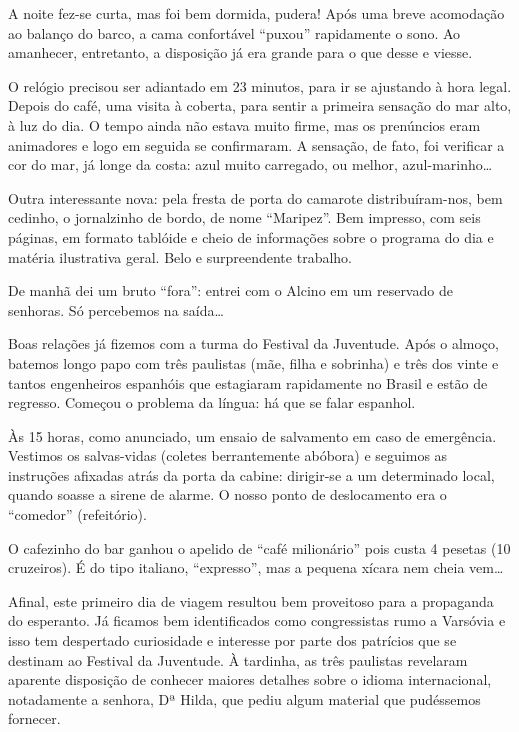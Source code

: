 A noite fez-se curta, mas foi bem dormida, pudera! Após uma breve acomodação ao balanço do barco, a cama confortável “puxou” rapidamente o sono. Ao amanhecer, entretanto, a disposição já era grande para o que desse e viesse.

O relógio precisou ser adiantado em 23 minutos, para ir se ajustando à hora legal. Depois do café, uma visita à coberta, para sentir a primeira sensação do mar alto, à luz do dia. O tempo ainda não estava muito firme, mas os prenúncios eram animadores e logo em seguida se confirmaram. A sensação, de fato, foi verificar a cor do mar, já longe da costa: azul muito carregado, ou melhor, azul-marinho\ldots

Outra interessante nova: pela fresta de porta do camarote distribuíram-nos, bem cedinho, o jornalzinho de bordo, de nome “Maripez”. Bem impresso, com seis páginas, em formato tablóide e cheio de informações sobre o programa do dia e matéria ilustrativa geral. Belo e surpreendente trabalho.

De manhã dei um bruto “fora”: entrei com o Alcino em um reservado de senhoras. Só percebemos na saída\ldots

Boas relações já fizemos com a turma do Festival da Juventude. Após o almoço, batemos longo papo com três paulistas (mãe, filha e sobrinha) e três dos vinte e tantos engenheiros espanhóis que estagiaram rapidamente no Brasil e estão de regresso. Começou o problema da língua: há que se falar espanhol.

Às 15 horas, como anunciado, um ensaio de salvamento em caso de emergência. Vestimos os salvas-vidas (coletes berrantemente abóbora) e seguimos as instruções afixadas atrás da porta da cabine: dirigir-se a um determinado local, quando soasse a sirene de alarme. O nosso ponto de deslocamento era o “comedor” (refeitório).

O cafezinho do bar ganhou o apelido de “café milionário” pois custa 4 pesetas (10 cruzeiros). É do tipo italiano, “expresso”, mas a pequena xícara nem cheia vem\ldots

Afinal, este primeiro dia de viagem resultou bem proveitoso para a propaganda do esperanto. Já ficamos bem identificados como congressistas rumo a Varsóvia e isso tem despertado curiosidade e interesse por parte dos patrícios que se destinam ao Festival da Juventude. À tardinha, as três paulistas revelaram aparente disposição de conhecer maiores detalhes sobre o idioma internacional, notadamente a senhora, Dª Hilda, que pediu algum material que pudéssemos fornecer.

